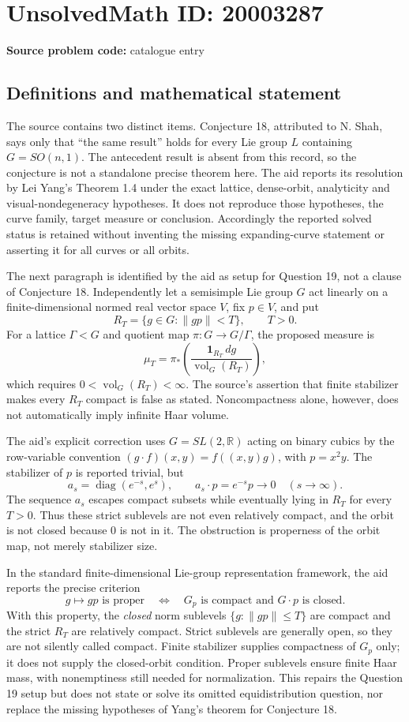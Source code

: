 \documentclass[11pt]{article}
\newcommand{\R}{\mathbb{R}}
\begin{document}
\section*{UnsolvedMath ID: 20003287}
\textbf{Source problem code:} catalogue entry
\subsection{Definitions and mathematical statement}
The source contains two distinct items. Conjecture 18, attributed to N. Shah, says only that ``the same result'' holds for every Lie group $L$ containing $G=SO(n,1)$. The antecedent result is absent from this record, so the conjecture is not a standalone precise theorem here. The aid reports its resolution by Lei Yang's Theorem 1.4 under the exact lattice, dense-orbit, analyticity and visual-nondegeneracy hypotheses. It does not reproduce those hypotheses, the curve family, target measure or conclusion. Accordingly the reported solved status is retained without inventing the missing expanding-curve statement or asserting it for all curves or all orbits.

The next paragraph is identified by the aid as setup for Question 19, not a clause of Conjecture 18. Independently let a semisimple Lie group $G$ act linearly on a finite-dimensional normed real vector space $V$, fix $p\in V$, and put
\[
 R_T=\{g\in G:\|gp\|<T\},\qquad T>0.
\]
For a lattice $\Gamma<G$ and quotient map $\pi:G\to G/\Gamma$, the proposed measure is
\[
 \mu_T=\pi_*\left(\frac{\mathbf1_{R_T}\,dg}{\operatorname{vol}_G(R_T)}\right),
\]
which requires $0<\operatorname{vol}_G(R_T)<\infty$. The source's assertion that finite stabilizer makes every $R_T$ compact is false as stated. Noncompactness alone, however, does not automatically imply infinite Haar volume.

The aid's explicit correction uses $G=SL(2,\R)$ acting on binary cubics by the row-variable convention $(g\cdot f)(x,y)=f((x,y)g)$, with $p=x^2y$. The stabilizer of $p$ is reported trivial, but
\[
 a_s=\operatorname{diag}(e^{-s},e^s),\qquad
 a_s\cdot p=e^{-s}p\longrightarrow0
 \quad(s\to\infty).
\]
The sequence $a_s$ escapes compact subsets while eventually lying in $R_T$ for every $T>0$. Thus these strict sublevels are not even relatively compact, and the orbit is not closed because $0$ is not in it. The obstruction is properness of the orbit map, not merely stabilizer size.

In the standard finite-dimensional Lie-group representation framework, the aid reports the precise criterion
\[
 g\mapsto gp\text{ is proper}
 \quad\Longleftrightarrow\quad
 G_p\text{ is compact and }G\cdot p\text{ is closed}.
\]
With this property, the \emph{closed} norm sublevels $\{g:\|gp\|\leq T\}$ are compact and the strict $R_T$ are relatively compact. Strict sublevels are generally open, so they are not silently called compact. Finite stabilizer supplies compactness of $G_p$ only; it does not supply the closed-orbit condition. Proper sublevels ensure finite Haar mass, with nonemptiness still needed for normalization. This repairs the Question 19 setup but does not state or solve its omitted equidistribution question, nor replace the missing hypotheses of Yang's theorem for Conjecture 18.
\end{document}
